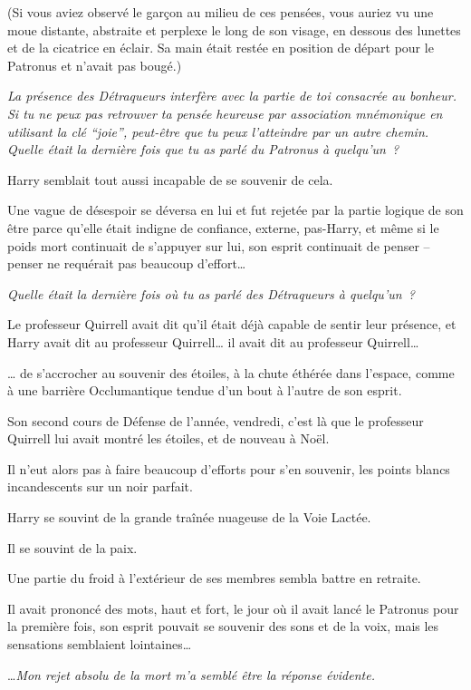 (Si vous aviez observé le garçon au milieu de ces pensées, vous auriez vu une moue distante, abstraite et perplexe le long de son visage, en dessous des lunettes et de la cicatrice en éclair. Sa main était restée en position de départ pour le Patronus et n'avait pas bougé.)

\emph{La présence des Détraqueurs interfère avec la partie de toi consacrée au bonheur. Si tu ne peux pas retrouver ta pensée heureuse par association mnémonique en utilisant la clé “joie”, peut-être que tu peux l'atteindre par un autre chemin. Quelle était la dernière fois que tu as parlé du Patronus à quelqu'un~?}

Harry semblait tout aussi incapable de se souvenir de cela.

Une vague de désespoir se déversa en lui et fut rejetée par la partie logique de son être parce qu'elle était indigne de confiance, externe, pas-Harry, et même si le poids mort continuait de s'appuyer sur lui, son esprit continuait de penser -- penser ne requérait pas beaucoup d'effort…

\emph{Quelle était la dernière fois où tu as parlé des Détraqueurs à quelqu'un~?}

Le professeur Quirrell avait dit qu'il était déjà capable de sentir leur présence, et Harry avait dit au professeur Quirrell… il avait dit au professeur Quirrell…

… de s'accrocher au souvenir des étoiles, à la chute éthérée dans l'espace, comme à une barrière Occlumantique tendue d'un bout à l'autre de son esprit.

Son second cours de Défense de l'année, vendredi, c'est là que le professeur Quirrell lui avait montré les étoiles, et de nouveau à Noël.

Il n'eut alors pas à faire beaucoup d'efforts pour s'en souvenir, les points blancs incandescents sur un noir parfait.

Harry se souvint de la grande traînée nuageuse de la Voie Lactée.

Il se souvint de la paix.

Une partie du froid à l'extérieur de ses membres sembla battre en retraite.

Il avait prononcé des mots, haut et fort, le jour où il avait lancé le Patronus pour la première fois, son esprit pouvait se souvenir des sons et de la voix, mais les sensations semblaient lointaines…

…\emph{Mon rejet absolu de la mort m'a semblé être la réponse évidente.}

